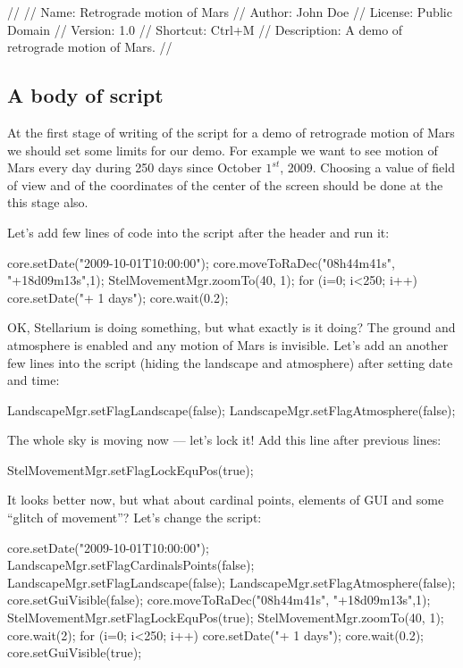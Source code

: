 \begin{script}
//
// Name: Retrograde motion of Mars
// Author: John Doe
// License: Public Domain
// Version: 1.0
// Shortcut: Ctrl+M
// Description: A demo of retrograde motion of Mars.
//
\end{script}

\subsection{A body of script}
At the first stage of writing of the script for a demo of 
retrograde motion of Mars we should set some limits for 
our demo. For example we want to see motion of Mars every 
day during 250 days since October $1^{st}$,  2009. 
Choosing a value of field of view and of the coordinates 
of the center of the screen should be done at the this 
stage also. 

Let's add few lines of code into the script after the header 
and run it:
\begin{script}
core.setDate("2009-10-01T10:00:00");
core.moveToRaDec("08h44m41s", "+18d09m13s",1);
StelMovementMgr.zoomTo(40, 1);
for (i=0; i<250; i++)
{
      core.setDate("+ 1 days");
      core.wait(0.2);
}
\end{script}

OK, Stellarium is doing something, but what exactly is it
doing? The ground and atmosphere is enabled and any 
motion of Mars is invisible. Let's add an another few 
lines into the script (hiding the landscape and atmosphere) 
after setting date and time:

\begin{script}
LandscapeMgr.setFlagLandscape(false);
LandscapeMgr.setFlagAtmosphere(false);
\end{script}

The whole sky is moving now --- let's lock it! Add this line 
after previous lines:
\begin{script}
StelMovementMgr.setFlagLockEquPos(true);
\end{script}

It looks better now, but what about cardinal points, 
elements of GUI and some ``glitch of movement''? 
Let's change the script:
\begin{script}
core.setDate("2009-10-01T10:00:00");
LandscapeMgr.setFlagCardinalsPoints(false);
LandscapeMgr.setFlagLandscape(false);
LandscapeMgr.setFlagAtmosphere(false);
core.setGuiVisible(false);
core.moveToRaDec("08h44m41s", "+18d09m13s",1);
StelMovementMgr.setFlagLockEquPos(true);
StelMovementMgr.zoomTo(40, 1);
core.wait(2);
for (i=0; i<250; i++)
{
      core.setDate("+ 1 days");
      core.wait(0.2);
}
core.setGuiVisible(true);
\end{script}

